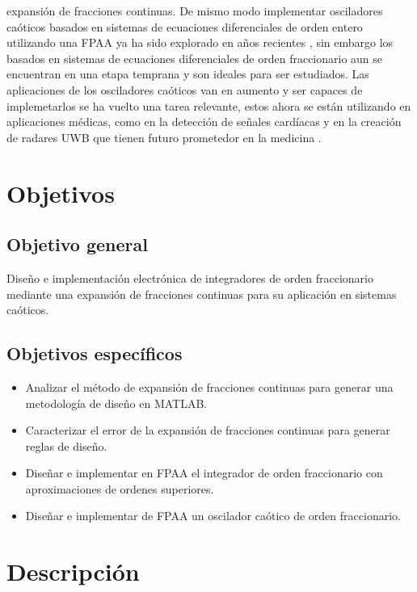 expansión de fracciones continuas. De mismo modo implementar osciladores caóticos basados en sistemas de ecuaciones diferenciales de orden entero utilizando una FPAA ya ha sido explorado en años recientes \cite{Li2018}, sin embargo los basados en sistemas de ecuaciones diferenciales de orden fraccionario aun se encuentran en una etapa temprana y son ideales para ser estudiados. Las aplicaciones de los osciladores caóticos van en aumento y ser capaces de implemetarlos se ha vuelto una tarea relevante, estos ahora se están utilizando en aplicaciones médicas, como en la detección de señales cardíacas \cite{Jiang2010} y en la creación de radares UWB que tienen futuro prometedor en la medicina \cite{Kumari2017}.
	
	\section{Objetivos}
	
		\subsection{Objetivo general}
			Diseño e implementación electrónica de integradores de orden fraccionario mediante una expansión de fracciones continuas para su aplicación en sistemas caóticos.		
		
		\subsection{Objetivos específicos}
			\begin{itemize}
			\item Analizar el método de expansión de fracciones continuas para generar una metodología de diseño en MATLAB.
			\item Caracterizar el error de la expansión de fracciones continuas para generar reglas de diseño.
			\item Diseñar e implementar en FPAA el integrador de orden fraccionario con aproximaciones de ordenes superiores.
			\item Diseñar e implementar de FPAA un oscilador caótico de orden fraccionario. 
		\end{itemize}
		
		
	\section{Descripción}

